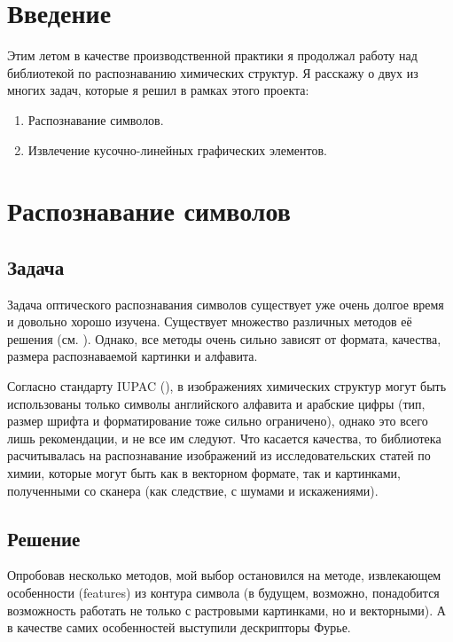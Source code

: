 





\renewcommand{\cftsecleader}{\cftdotfill{\cftsubsecdotsep}}
\tableofcontents

\pagebreak

\section{Введение}

Этим летом в качестве производственной практики я продолжал работу
над библиотекой по распознаванию химических структур. Я расскажу о двух из 
многих задач, которые я решил в рамках этого проекта:
\begin{enumerate}
\item Распознавание символов.
\item Извлечение кусочно-линейных графических элементов.
\end{enumerate}

\section{Распознавание символов}

\subsection{Задача}
Задача оптического распознавания символов существует уже очень долгое время и довольно 
хорошо изучена. Существует множество различных методов её решения (см. \cite{ocr}). Однако, 
все методы очень сильно зависят от формата, качества, размера распознаваемой 
картинки и алфавита.

Согласно стандарту IUPAC (\cite{iupac}), в изображениях химических структур могут быть 
использованы только символы английского алфавита и арабские цифры (тип, 
размер шрифта и форматирование тоже сильно ограничено), однако это всего лишь 
рекомендации, и не все им следуют. Что касается качества, то библиотека расчитывалась на распознавание
изображений из исследовательских статей по химии, которые могут быть как в векторном формате, 
так и картинками, полученными со сканера (как следствие, с шумами и искажениями).

\subsection{Решение}
Опробовав несколько методов, мой выбор остановился на методе, извлекающем 
особенности (features) из контура символа (в будущем, возможно, понадобится 
возможность работать не только с растровыми картинками, но и векторными).
А в качестве самих особенностей выступили дескрипторы Фурье.

